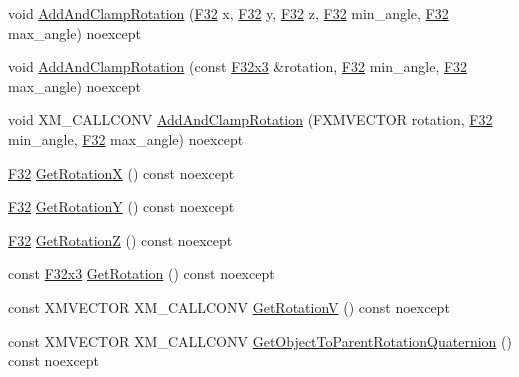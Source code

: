 \begin{DoxyCompactItemize}
\item 
void \hyperlink{classmage_1_1_transform_a7d71b079115dcfae2747191f786713e1}{Add\+And\+Clamp\+Rotation} (\hyperlink{namespacemage_aa97e833b45f06d60a0a9c4fc22ae02c0}{F32} x, \hyperlink{namespacemage_aa97e833b45f06d60a0a9c4fc22ae02c0}{F32} y, \hyperlink{namespacemage_aa97e833b45f06d60a0a9c4fc22ae02c0}{F32} z, \hyperlink{namespacemage_aa97e833b45f06d60a0a9c4fc22ae02c0}{F32} min\+\_\+angle, \hyperlink{namespacemage_aa97e833b45f06d60a0a9c4fc22ae02c0}{F32} max\+\_\+angle) noexcept
\item 
void \hyperlink{classmage_1_1_transform_a7b927a5fcbea3474ff75b6b495eee854}{Add\+And\+Clamp\+Rotation} (const \hyperlink{namespacemage_a73fbe0da4b8d5bc156bb8453e5b63a17}{F32x3} \&rotation, \hyperlink{namespacemage_aa97e833b45f06d60a0a9c4fc22ae02c0}{F32} min\+\_\+angle, \hyperlink{namespacemage_aa97e833b45f06d60a0a9c4fc22ae02c0}{F32} max\+\_\+angle) noexcept
\item 
void X\+M\+\_\+\+C\+A\+L\+L\+C\+O\+NV \hyperlink{classmage_1_1_transform_a1d202399e423a66a7dfd773b86f42b40}{Add\+And\+Clamp\+Rotation} (F\+X\+M\+V\+E\+C\+T\+OR rotation, \hyperlink{namespacemage_aa97e833b45f06d60a0a9c4fc22ae02c0}{F32} min\+\_\+angle, \hyperlink{namespacemage_aa97e833b45f06d60a0a9c4fc22ae02c0}{F32} max\+\_\+angle) noexcept
\item 
\hyperlink{namespacemage_aa97e833b45f06d60a0a9c4fc22ae02c0}{F32} \hyperlink{classmage_1_1_transform_ad3e1b49ccac234303ff28c8aea6f8e4a}{Get\+RotationX} () const noexcept
\item 
\hyperlink{namespacemage_aa97e833b45f06d60a0a9c4fc22ae02c0}{F32} \hyperlink{classmage_1_1_transform_ac1962d03093b3671fcfb6a9b4f410628}{Get\+RotationY} () const noexcept
\item 
\hyperlink{namespacemage_aa97e833b45f06d60a0a9c4fc22ae02c0}{F32} \hyperlink{classmage_1_1_transform_a1c2ae96eb6c0d33afd406ca1685b74f5}{Get\+RotationZ} () const noexcept
\item 
const \hyperlink{namespacemage_a73fbe0da4b8d5bc156bb8453e5b63a17}{F32x3} \hyperlink{classmage_1_1_transform_a693bc4ac41f3690122344054cc4b64b2}{Get\+Rotation} () const noexcept
\item 
const X\+M\+V\+E\+C\+T\+OR X\+M\+\_\+\+C\+A\+L\+L\+C\+O\+NV \hyperlink{classmage_1_1_transform_af402e4f2aebed389ca77802fe7ff766b}{Get\+RotationV} () const noexcept
\item 
const X\+M\+V\+E\+C\+T\+OR X\+M\+\_\+\+C\+A\+L\+L\+C\+O\+NV \hyperlink{classmage_1_1_transform_a26cc5edc32e86bad8f3b798b39206998}{Get\+Object\+To\+Parent\+Rotation\+Quaternion} () const noexcept

\end{DoxyCompactItemize}
